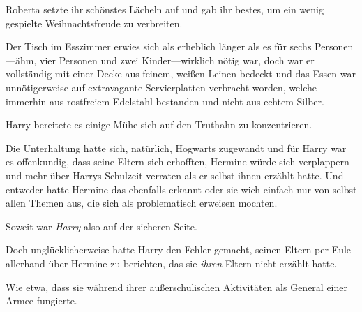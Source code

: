 Roberta setzte ihr schönstes Lächeln auf und gab ihr bestes, um ein wenig gespielte Weihnachtsfreude zu verbreiten.

\later

Der Tisch im Esszimmer erwies sich als erheblich länger als es für sechs Personen—ähm, vier Personen und zwei Kinder—wirklich nötig war, doch war er vollständig mit einer Decke aus feinem, weißen Leinen bedeckt und das Essen war unnötigerweise auf extravagante Servierplatten verbracht worden, welche immerhin aus rostfreiem Edelstahl bestanden und nicht aus echtem Silber.

Harry bereitete es einige Mühe sich auf den Truthahn zu konzentrieren.

Die Unterhaltung hatte sich, natürlich, Hogwarts zugewandt und für Harry war es offenkundig, dass seine Eltern sich erhofften, Hermine würde sich verplappern und mehr über Harrys Schulzeit verraten als er selbst ihnen erzählt hatte. Und entweder hatte Hermine das ebenfalls erkannt oder sie wich einfach nur von selbst allen Themen aus, die sich als problematisch erweisen mochten.

Soweit war \emph{Harry} also auf der sicheren Seite.

Doch unglücklicherweise hatte Harry den Fehler gemacht, seinen Eltern per Eule allerhand über Hermine zu berichten, das sie \emph{ihren} Eltern nicht erzählt hatte.

Wie etwa, dass sie während ihrer außerschulischen Aktivitäten als General einer Armee fungierte.

